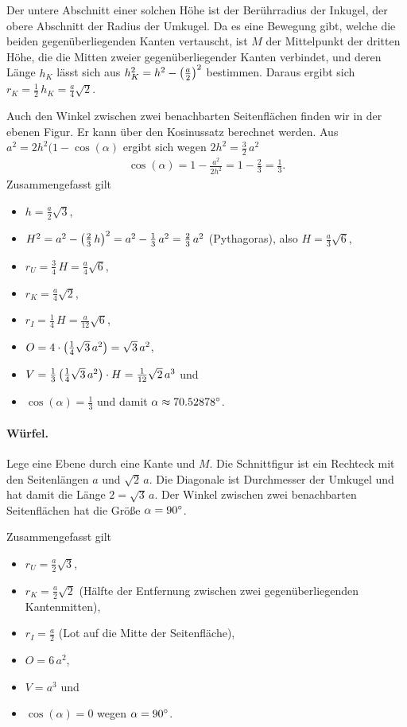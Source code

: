 \documentclass[11pt]{article}
\begin{document}
Der untere Abschnitt einer solchen Höhe ist der Berührradius der Inkugel, der
obere Abschnitt der Radius der Umkugel.  Da es eine Bewegung gibt, welche die
beiden gegenüberliegenden Kanten vertauscht, ist $M$ der Mittelpunkt der
dritten Höhe, die die Mitten zweier gegenüberliegender Kanten verbindet, und
deren Länge $h_K$ lässt sich aus $h_K^2=h^2-\left(\frac{a}{2}\right)^2$ bestimmen.
Daraus ergibt sich $r_K=\frac12\,h_K=\frac{a}{4}\sqrt{2}$.
\newpage

Auch den Winkel zwischen zwei benachbarten Seitenflächen finden wir in der
ebenen Figur.  Er kann über den Kosinussatz berechnet werden. Aus
$a^2=2h^2(1-\cos(\alpha)$ ergibt sich wegen $2h^2=\frac32\,a^2$
\begin{gather*}
  \cos(\alpha)=1-\frac{a^2}{2h^2}=1-\frac23=\frac13.
\end{gather*}
Zusammengefasst gilt
\begin{itemize}
\item $h=\frac{a}{2}\sqrt{3}$,
\item $H^2=a^2-\left(\frac23\,h\right)^2=a^2-\frac13\,a^2=\frac23\,a^2$ (Pythagoras),
  also $H=\frac{a}{3}\sqrt{6}$,
\item $r_U=\frac34\,H=\frac{a}{4}\sqrt{6}$,
\item $r_K=\frac{a}{4}\sqrt{2}$, 
\item $r_I=\frac14\,H=\frac{a}{12}\sqrt{6}$,
\item $O=4\cdot \left(\frac14\sqrt{3}\,a^2\right)=\sqrt{3}\,a^2$, 
\item $V=\frac13 \left(\frac14\sqrt{3}\,a^2\right)\cdot H = \frac{1}{12}\sqrt{2}\,a^3$
  und 
\item $\cos(\alpha)=\frac13$ und damit $\alpha\approx 70.52878^{\circ}$.
\end{itemize}

\paragraph{Würfel.}
Lege eine Ebene durch eine Kante und $M$. Die Schnittfigur ist ein Rechteck
mit den Seitenlängen $a$ und $\sqrt{2}\,a$.  Die Diagonale ist Durchmesser der
Umkugel und hat damit die Länge $2=\sqrt{3}\,a$. Der Winkel zwischen zwei
benachbarten Seitenflächen hat die Größe $\alpha=90^{\circ}$.

Zusammengefasst gilt
\begin{itemize}
\item $r_U=\frac{a}{2}\sqrt{3}$, 
\item $r_K=\frac{a}{2}\sqrt{2}$ (Hälfte der Entfernung zwischen zwei
  gegenüberliegenden Kantenmitten),
\item $r_I=\frac{a}{2}$ (Lot auf die Mitte der Seitenfläche),
\item $O=6\,a^2$,
\item $V=a^3$ und
\item $\cos(\alpha)=0$ wegen $\alpha=90^{\circ}$.
\end{itemize}
\end{document}
